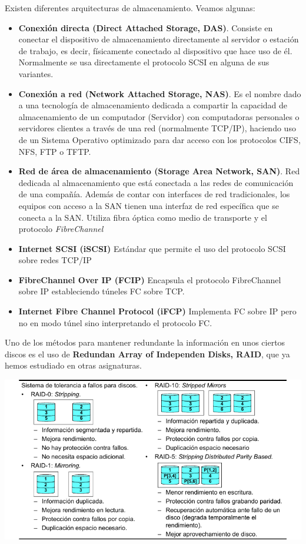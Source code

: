 Existen diferentes arquitecturas de almacenamiento. Veamos algunas:
\begin{itemize}
\item \textbf{Conexión directa (Direct Attached Storage, DAS)}. Consiste en conectar el dispositivo de almacenamiento directamente al servidor o estación de trabajo, es decir, físicamente conectado al dispositivo que hace uso de él. Normalmente se usa directamente el protocolo SCSI en alguna de sus variantes.

\item \textbf{Conexión a red (Network Attached Storage, NAS)}. Es el nombre dado a una tecnología de almacenamiento dedicada a compartir la capacidad de almacenamiento de un computador (Servidor) con computadoras personales o servidores clientes a través de una red (normalmente TCP/IP), haciendo uso de un Sistema Operativo optimizado para dar acceso con los protocolos CIFS, NFS, FTP o TFTP.

\item \textbf{Red de área de almacenamiento (Storage Area Network, SAN)}. Red dedicada al almacenamiento que está conectada a las redes de comunicación de una compañía. Además de contar con interfaces de red tradicionales, los equipos con acceso a la SAN tienen una interfaz de red específica que se conecta a la SAN. Utiliza fibra óptica como medio de transporte y el protocolo \textit{FibreChannel}

\item \textbf{Internet SCSI (iSCSI)} Estándar que permite el uso del protocolo SCSI sobre redes TCP/IP

\item \textbf{FibreChannel Over IP (FCIP)} Encapsula el protocolo FibreChannel sobre IP estableciendo túneles FC sobre TCP.

\item \textbf{Internet Fibre Channel Protocol (iFCP)} Implementa FC sobre IP pero no en modo túnel sino interpretando el protocolo FC.
\end{itemize}

Uno de los métodos para mantener redundante la información en unos ciertos discos es el uso de \textbf{Redundan Array of Independen Disks, RAID}, que ya hemos estudiado en otras asignaturas.

\begin{center}
\includegraphics[width=\linewidth]{img/raid.png}
\end{center}


